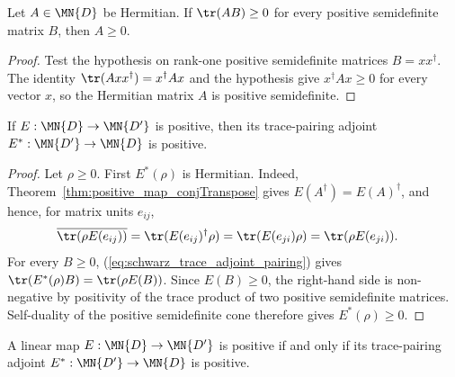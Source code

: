 \begin{theorem}
    \label{thm:psd_trace_pairing_self_dual}
    \leanok
    Let $A \in \MN{D}$ be Hermitian. If $\tr(AB)\geq 0$ for every
    positive semidefinite matrix $B$, then $A\geq 0$.
\end{theorem}

\begin{proof}
    \leanok
    Test the hypothesis on rank-one positive semidefinite matrices
    $B=xx^\dagger$. The identity $\tr(Axx^\dagger)=x^\dagger A x$ and the
    hypothesis give $x^\dagger A x\geq 0$ for every vector $x$, so the
    Hermitian matrix $A$ is positive semidefinite.
\end{proof}

\begin{theorem}\label{thm:trace_pairing_adjoint_positive}
    \leanok
    If $E : \MN{D}\to\MN{D'}$ is positive, then its
    trace-pairing adjoint
    $E^* : \MN{D'}\to\MN{D}$ is positive.
\end{theorem}

\begin{proof}
    \leanok
    Let $\rho\geq 0$. First $E^*(\rho)$ is Hermitian. Indeed,
    Theorem~\ref{thm:positive_map_conjTranspose} gives
    $E(A^\dagger)=E(A)^\dagger$, and hence, for matrix units
    $e_{ij}$,
    \begin{align}
        \overline{\tr(\rho E(e_{ij}))}
         & =\tr(E(e_{ij})^\dagger\rho)
        =\tr(E(e_{ji})\rho)
        =\tr(\rho E(e_{ji})).
        \notag
    \end{align}
    For every $B\geq 0$, (\ref{eq:schwarz_trace_adjoint_pairing}) gives
    $\tr(E^*(\rho)B)=\tr(\rho E(B))$.
    Since $E(B)\geq 0$, the right-hand side is non-negative by positivity of
    the trace product of two positive semidefinite matrices. Self-duality of
    the positive semidefinite cone therefore gives $E^*(\rho)\geq 0$.
\end{proof}

\begin{theorem}\label{thm:trace_pairing_adjoint_positive_iff}
    \leanok
    A linear map $E:\MN{D}\to\MN{D'}$ is positive if and
    only if its trace-pairing adjoint
    $E^*:\MN{D'}\to\MN{D}$ is positive.
\end{theorem}

